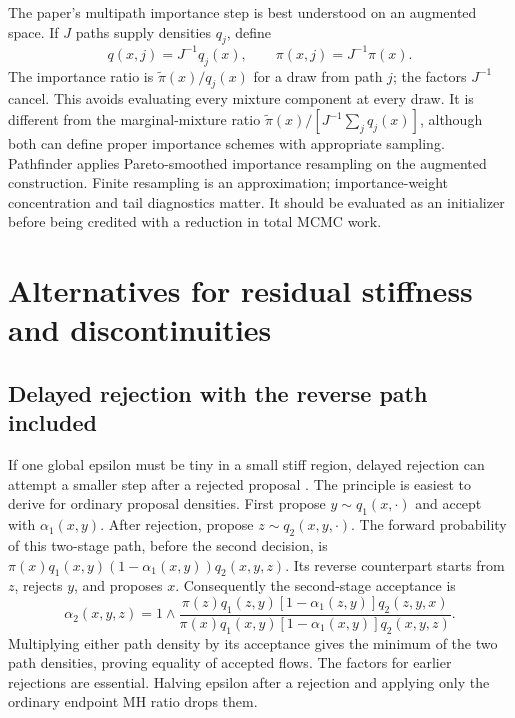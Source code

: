 The paper's multipath importance step is best understood on an augmented
space. If $J$ paths supply densities $q_j$, define
\begin{equation}
 q(x,j)=J^{-1}q_j(x),\qquad \pi(x,j)=J^{-1}\pi(x).
 \label{eq:bf-modern-pathfinder-augmented}
\end{equation}
The importance ratio is $\widetilde\pi(x)/q_j(x)$ for a draw from path $j$;
the factors $J^{-1}$ cancel. This avoids evaluating every mixture component
at every draw. It is different from the marginal-mixture ratio
$\widetilde\pi(x)/[J^{-1}\sum_j q_j(x)]$, although both can define
proper importance schemes with appropriate sampling. Pathfinder applies
Pareto-smoothed importance resampling on the augmented construction. Finite
resampling is an approximation; importance-weight concentration and tail
diagnostics matter. It should be evaluated as an initializer before being
credited with a reduction in total MCMC work.

\section{Alternatives for residual stiffness and discontinuities}
\label{sec:bf-modern-specialist}

\subsection{Delayed rejection with the reverse path included}

If one global epsilon must be tiny in a small stiff region, delayed rejection
can attempt a smaller step after a rejected proposal
\citep{turok2026drghmc}. The principle is easiest to derive for ordinary
proposal densities. First propose $y\sim q_1(x,\cdot)$ and accept with
$\alpha_1(x,y)$. After rejection, propose
$z\sim q_2(x,y,\cdot)$. The forward probability of this two-stage path,
before the second decision, is
$\pi(x)q_1(x,y)(1-\alpha_1(x,y))q_2(x,y,z)$.
Its reverse counterpart starts from $z$, rejects $y$, and proposes $x$.
Consequently the second-stage acceptance is
\begin{equation}
 \alpha_2(x,y,z)=1\wedge
 \frac{\pi(z)q_1(z,y)[1-\alpha_1(z,y)]q_2(z,y,x)}
      {\pi(x)q_1(x,y)[1-\alpha_1(x,y)]q_2(x,y,z)}.
 \label{eq:bf-modern-delayed-rejection}
\end{equation}
Multiplying either path density by its acceptance gives the minimum of the
two path densities, proving equality of accepted flows. The factors for
earlier rejections are essential. Halving epsilon after a rejection and
applying only the ordinary endpoint MH ratio drops them.

